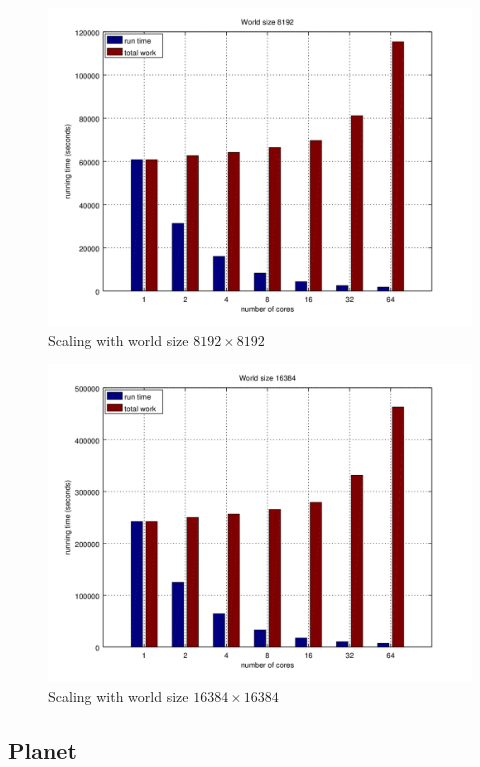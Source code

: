 \documentclass[a4paper]{article}
\begin{document}
\begin{figure}
    \centering
    \includegraphics[width=\textwidth]{scaling-8192}
    \caption{Scaling with world size $8192 \times 8192$}
\end{figure}

\begin{figure}
    \centering
    \includegraphics[width=\textwidth]{scaling-16384}
    \caption{Scaling with world size $16384 \times 16384$}
\end{figure}

\subsection{Planet}
\end{document}
